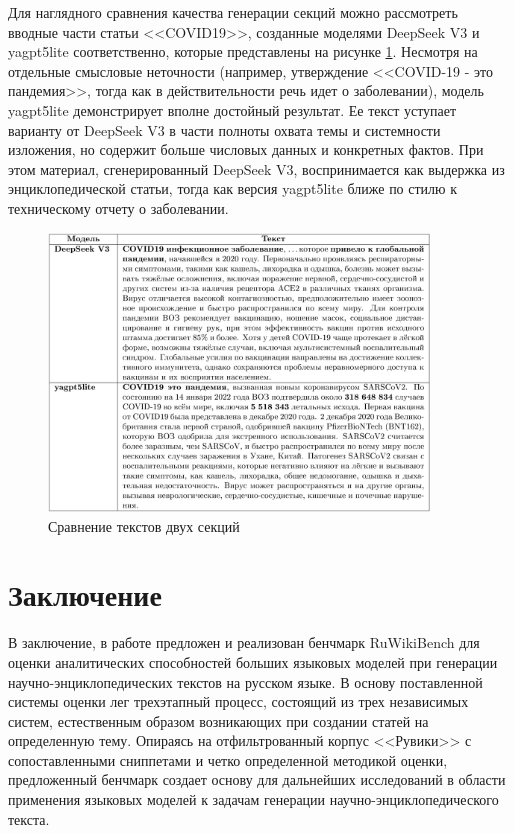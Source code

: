 \documentclass{article}
\begin{document}
Для наглядного сравнения качества генерации секций можно рассмотреть вводные части статьи <<COVID19>>, 
созданные моделями DeepSeek V3 и yagpt5lite соответственно, которые представлены на рисунке \ref{fig:secs_com}.
Несмотря на отдельные смысловые неточности (например, утверждение <<COVID-19 - это пандемия>>, тогда как в действительности речь идет о заболевании), 
модель yagpt5lite демонстрирует вполне достойный результат. Ее текст уступает варианту от DeepSeek V3 в части полноты охвата темы и системности изложения, 
но содержит больше числовых данных и конкретных фактов. При этом материал, сгенерированный DeepSeek V3, воспринимается как выдержка из энциклопедической статьи, 
тогда как версия yagpt5lite ближе по стилю к техническому отчету о заболевании.

\begin{figure}[ht!]
  \centering
  \includegraphics[width=0.9\textwidth]{figures/two_secs.png}
  \caption{Сравнение текстов двух секций}
  \label{fig:secs_com}
\end{figure}

\section*{Заключение}
В заключение, в работе предложен и реализован бенчмарк RuWikiBench для оценки аналитических способностей больших языковых моделей при генерации научно-энциклопедических текстов на русском языке.
В основу поставленной системы оценки лег трехэтапный процесс, состоящий из трех независимых систем, естественным образом возникающих при создании статей на определенную тему.
Опираясь на отфильтрованный корпус <<Рувики>> с сопоставленными сниппетами и четко определенной методикой оценки, 
предложенный бенчмарк создает основу для дальнейших исследований в области применения языковых моделей к задачам генерации научно-энциклопедического текста. 
\end{document}
